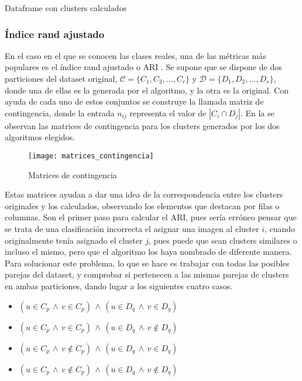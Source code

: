 				\begin{table}[!h]
					\tiny
					\centering
					\texttt{}
					\caption{Dataframe con clusters calculados}
					\label{tab:df_clusters}
				\end{table}
				
				\subsubsection{Índice rand ajustado}
				
					En el caso en el que se conocen las clases reales, una de las métricas más populares es el índice rand ajustado o ARI \cite{ari}. Se supone que se dispone de dos particiones del dataset original, $\mathcal{C} = \{C_1, C_2, \ldots, C_r\}$ y $\mathcal{D} = \{D_1, D_2, \ldots, D_s\}$, donde una de ellas es la generada por el algoritmo, y la otra es la original. Con ayuda de cada uno de estos conjuntos se construye la llamada matriz de contingencia, donde la entrada $n_{ij}$ representa el valor de $|C_i \cap D_j|$. En la  se observan las matrices de contingencia para los clusters generados por los dos algoritmos elegidos. 
					
					\begin{figure}[!h]
						\centering
						\texttt{[image: matrices\_contingencia]}
						\caption{Matrices de contingencia}
						\label{fig:matrices_contingencia}
					\end{figure} 
					
					Estas matrices ayudan a dar una idea de la correspondencia entre los clusters originales y los calculados, observando los elementos que destacan por filas o columnas. Son el primer paso para calcular el ARI, pues sería erróneo pensar que se trata de una clasificación incorrecta el asignar una imagen al cluster $i$, cuando originalmente tenía asignado el cluster $j$, pues puede que sean clusters similares o incluso el mismo, pero que el algoritmo los haya nombrado de diferente manera. Para solucionar este problema, lo que se hace es trabajar con todas las posibles parejas del dataset, y comprobar si pertenecen a las mismas parejas de clusters en ambas particiones, dando lugar a los siguientes cuatro casos. 
					
					\begin{itemize}
						\item $(u \in C_p \,\land\, v \in C_p) \,\land\, (u \in D_q \,\land\, v \in D_q)$
						\item  $(u \in C_p \,\land\, v \in C_p) \,\land\, (u \in D_q \,\land\, v \not\in D_q)$
						\item  $(u \in C_p \,\land\, v \not\in C_p) \,\land\, (u \in D_q \,\land\, v \in D_q)$
						\item  $(u \in C_p \,\land\, v \not\in C_p) \,\land\, (u \in D_q \,\land\, v \not\in D_q)$
					\end{itemize}
					

